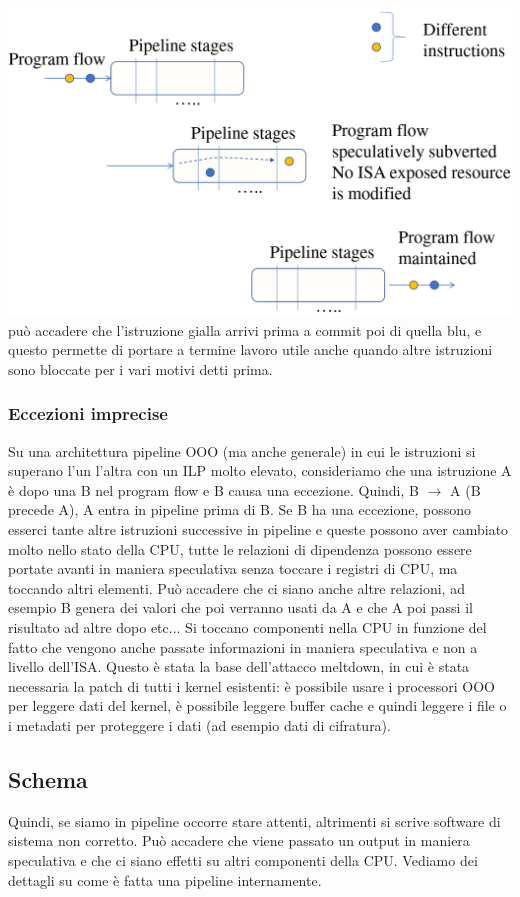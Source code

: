 \documentclass[14pt]{article}
\begin{document}
\includegraphics[scale=0.2]{immagini/pipeline-ooo}\\
può accadere che l'istruzione gialla arrivi prima a commit poi di quella blu, e questo permette di portare a termine lavoro utile anche quando altre istruzioni sono bloccate per i vari motivi detti prima.
\subsubsection{Eccezioni imprecise}
Su una architettura pipeline OOO (ma anche generale) in cui le istruzioni si superano l'un l'altra con un ILP molto elevato, consideriamo che una istruzione A è dopo una B nel program flow e B causa una eccezione. Quindi, B $\rightarrow$ A (B precede A), A entra in pipeline prima di B. Se B ha una eccezione, possono esserci tante altre istruzioni successive in pipeline e queste possono aver cambiato molto nello stato della CPU, tutte le relazioni di dipendenza possono essere portate avanti in maniera speculativa senza toccare i registri di CPU, ma toccando altri elementi. Può accadere che ci siano anche altre relazioni, ad esempio B genera dei valori che poi verranno usati da A e che A poi passi il risultato ad altre dopo etc... Si toccano componenti nella CPU in funzione del fatto che vengono anche passate informazioni in maniera speculativa e non a livello dell'ISA. Questo è stata la base dell'attacco meltdown, in cui è stata necessaria la patch di tutti i kernel esistenti: è possibile usare i processori OOO per leggere dati del kernel, è possibile leggere buffer cache e quindi leggere i file o i metadati per proteggere i dati (ad esempio dati di cifratura).
\subsection{Schema}
Quindi, se siamo in pipeline occorre stare attenti, altrimenti si scrive software di sistema non corretto. Può accadere che viene passato un output in maniera speculativa e che ci siano effetti su altri componenti della CPU. Vediamo dei dettagli su come è fatta una pipeline internamente.
\end{document}
